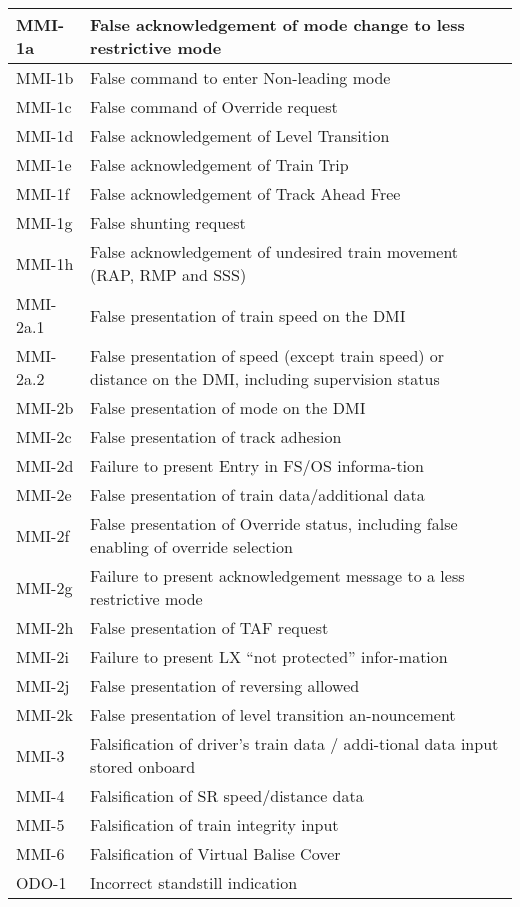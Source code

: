 \documentclass{template/openetcs_article}
\begin{document}
\begin{center}
\begin{longtable}{|m{3cm}|m{13cm}|}
MMI-1a & False acknowledgement of mode change to less restrictive mode \\\hline
MMI-1b & False command to enter Non-leading mode \\\hline
MMI-1c & False command of Override request \\\hline
MMI-1d & False acknowledgement of Level Transition \\\hline
MMI-1e & False acknowledgement of Train Trip \\\hline
MMI-1f & False acknowledgement of Track Ahead Free \\\hline
MMI-1g & False shunting request \\\hline
MMI-1h & False acknowledgement of undesired train movement (RAP, RMP and SSS) \\\hline
MMI-2a.1 & False presentation of train speed on the DMI \\\hline
MMI-2a.2 & False presentation of speed (except train speed) or distance on the DMI, including supervision status \\\hline
MMI-2b & False presentation of mode on the DMI \\\hline
MMI-2c & False presentation of track adhesion \\\hline
MMI-2d & Failure to present Entry in FS/OS informa-tion \\\hline
MMI-2e & False presentation of train data/additional data \\\hline
MMI-2f & False presentation of Override status, including false enabling of override selection \\\hline
MMI-2g & Failure to present acknowledgement message to a less restrictive mode \\\hline
MMI-2h & False presentation of TAF request \\\hline
MMI-2i & Failure to present LX “not protected” infor-mation \\\hline
MMI-2j & False presentation of reversing allowed \\\hline
MMI-2k & False presentation of level transition an-nouncement\\\hline
MMI-3 & Falsification of driver's train data / addi-tional data input stored onboard \\\hline
MMI-4 & Falsification of SR speed/distance data \\\hline
MMI-5 & Falsification of train integrity input \\\hline
MMI-6 & Falsification of Virtual Balise Cover \\\hline
ODO-1 & Incorrect standstill indication \\\hline

\end{longtable}
\end{center}
\end{document}
